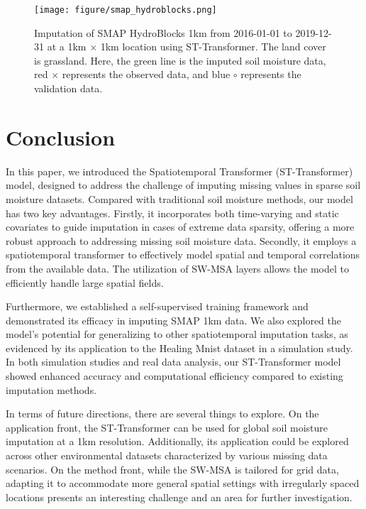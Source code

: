 \documentclass[11pt]{article}
\begin{document}
 
\begin{figure}
\centering
\texttt{[image: figure/smap\_hydroblocks.png]}
\caption{Imputation of SMAP HydroBlocks 1km from 2016-01-01 to 2019-12-31 at a 1km $\times$ 1km location using ST-Transformer. The land cover is grassland. Here, the green line is the imputed soil moisture data, red $\times$ represents the observed data, and blue $\circ$ represents the validation data.}
\label{fig: smap_hydroblock}
\end{figure}
 
 





\section{Conclusion}
In this paper, we introduced the Spatiotemporal Transformer (ST-Transformer) model, designed to address the challenge of imputing missing values in sparse soil moisture datasets. Compared with traditional soil moisture methods, our model has two key advantages. Firstly, it incorporates both time-varying and static covariates to guide imputation in cases of extreme data sparsity, offering a more robust approach to addressing missing soil moisture data. Secondly, it employs a spatiotemporal transformer to effectively model spatial and temporal correlations from the available data. The utilization of SW-MSA layers allows the model to efficiently handle large spatial fields. 

Furthermore, we established a self-supervised training framework and demonstrated its efficacy in imputing SMAP 1km data. We also explored the model's potential for generalizing to other spatiotemporal imputation tasks, as evidenced by its application to the Healing Mnist dataset in a simulation study.  In both simulation studies and real data analysis, our ST-Transformer model showed enhanced accuracy and computational efficiency compared to existing imputation methods. 




In terms of future directions, there are several things to explore. On the application front, the ST-Transformer can be used for global soil moisture imputation at a 1km resolution. Additionally, its application could be explored across other environmental datasets characterized by various missing data scenarios. On the method front, while the SW-MSA is tailored for grid data, adapting it to accommodate more general spatial settings with irregularly spaced locations presents an interesting challenge and an area for further investigation.
\end{document}
